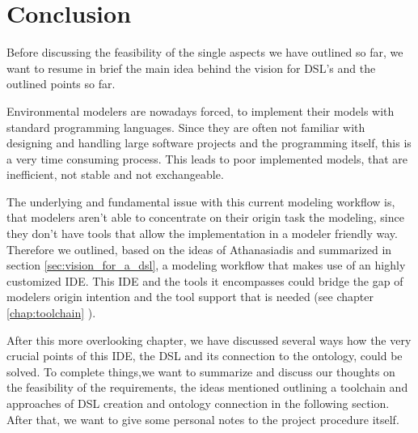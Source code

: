 \chapter{Conclusion}
\par
Before discussing the feasibility of the single aspects we have outlined so far, we want to resume in brief the main idea behind the vision for DSL's and the outlined points so far.
\par
Environmental modelers are nowadays forced, to implement their models with standard programming languages. Since they are often not familiar with designing and handling large software projects and the programming itself, this is a very time consuming process. This leads to poor implemented models, that are inefficient, not stable and not exchangeable.
\par
The underlying and fundamental issue with this current modeling workflow is, that modelers aren’t able to concentrate on their origin task the modeling, since they don't have tools that allow the implementation in a modeler friendly way. Therefore we outlined, based on the ideas of Athanasiadis and summarized in section \ref{sec:vision_for_a_dsl}, a modeling workflow that makes use of an highly customized IDE. This IDE and the tools it encompasses could bridge the gap of modelers origin intention and the tool support that is needed (see chapter \ref{chap:toolchain} ).
\par
After this more overlooking chapter, we have discussed several ways how the very crucial points of this IDE, the DSL and its connection to the ontology, could be solved. To complete things,we want to summarize and discuss our thoughts on the feasibility of the requirements, the ideas mentioned outlining a toolchain and approaches of DSL creation and ontology connection in the following section. After that, we want to give some personal notes to the project procedure itself. 
